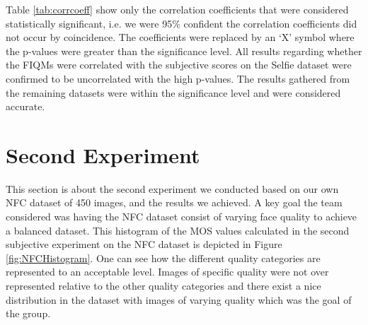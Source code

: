 \begin{table}[h]
\caption{All correlation coefficients on the three datasets between ISO Metrics, FaceQnet, FIQMs Weighted AVG and the subjective scores. The `X'-symbol indicated the correlation coefficients that had a p-value higher than 0.05 and were therefore ignored. The coefficients were not calculated where the `-' symbol is placed.}
\label{tab:corrcoeff}
\end{table}
\noindent
Table \ref{tab:corrcoeff} show only the correlation coefficients that were considered statistically significant, i.e. we were 95\% confident the correlation coefficients did not occur by coincidence. The coefficients were replaced by an `X' symbol where the p-values were greater than the significance level. All results regarding whether the FIQMs were correlated with the subjective scores on the Selfie dataset were confirmed to be uncorrelated with the high p-values. The results gathered from the remaining datasets were within the significance level and were considered accurate.  


\section{Second Experiment}
This section is about the second experiment we conducted based on our own NFC dataset of 450 images, and the results we achieved. A key goal the team considered was having the NFC dataset consist of varying face quality to achieve a balanced dataset. This histogram of the MOS values calculated in the second subjective experiment on the NFC dataset is depicted in Figure \ref{fig:NFCHistogram}. One can see how the different quality categories are represented to an acceptable level. Images of specific quality were not over represented relative to the other quality categories and there exist a nice distribution in the dataset with images of varying quality which was the goal of the group. 

